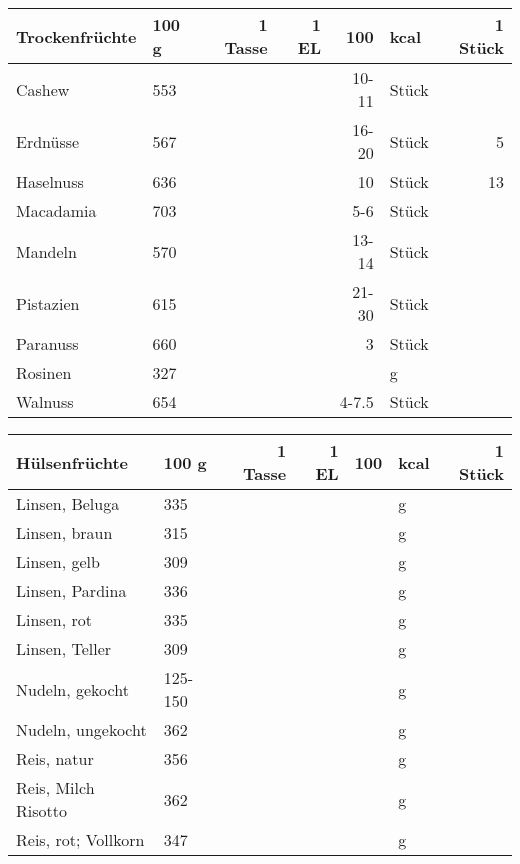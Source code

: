\vfill

\begin{tabularx}{\linewidth}{X|l|r|r|rl|r}
Trockenfrüchte    &   100 g & 1 Tasse & 1 EL &      100 & kcal    & 1 Stück  \\
\hline
Cashew            &     553 &         &      &  10-11   & Stück   &          \\
Erdnüsse          &     567 &         &      &  16-20   & Stück   &       5  \\
Haselnuss         &     636 &         &      &     10   & Stück   &      13  \\
Macadamia         &     703 &         &      &    5-6   & Stück   &          \\
Mandeln           &     570 &         &      &  13-14   & Stück   &          \\
Pistazien         &     615 &         &      &  21-30   & Stück   &          \\
Paranuss          &     660 &         &      &      3   & Stück   &          \\
Rosinen           &     327 &         &      &          & g       &          \\
Walnuss           &     654 &         &      &    4-7.5 & Stück   &          \\
\end{tabularx}

\newpage

\begin{tabularx}{\linewidth}{X|l|r|r|rl|r}
Hülsenfrüchte        &   100 g & 1 Tasse & 1 EL &      100 & kcal    & 1 Stück  \\
\hline
Linsen, Beluga       &     335 &         &      &          & g       &          \\
Linsen, braun        &     315 &         &      &          & g       &          \\
Linsen, gelb         &     309 &         &      &          & g       &          \\
Linsen, Pardina      &     336 &         &      &          & g       &          \\
Linsen, rot          &     335 &         &      &          & g       &          \\
Linsen, Teller       &     309 &         &      &          & g       &          \\
Nudeln, gekocht      & 125-150 &         &      &          & g       &          \\
Nudeln, ungekocht    &     362 &         &      &          & g       &          \\
Reis, natur          &     356 &         &      &          & g       &          \\
Reis, Milch Risotto  &     362 &         &      &          & g       &          \\
Reis, rot; Vollkorn  &     347 &         &      &          & g       &          \\
\end{tabularx}

